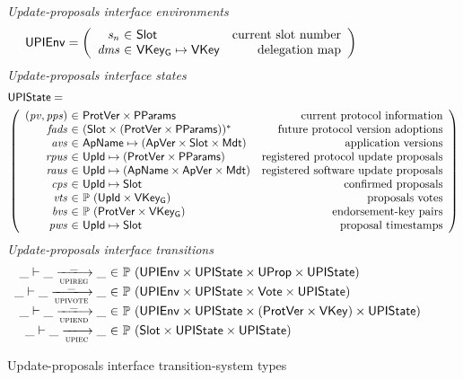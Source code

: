 \begin{figure}[htb]
  \emph{Update-proposals interface environments}
  \begin{align*}
    & \UPIEnv
      = \left(
      \begin{array}{r@{~\in~}lr}
        \var{s_n} & \Slot & \text{current slot number}\\
        \var{dms} & \VKeyGen \mapsto \VKey & \text{delegation map}
      \end{array}\right)
  \end{align*}
  \emph{Update-proposals interface states}
  \begin{align*}
    & \UPIState = \\
    & \left(
      \begin{array}{r@{~\in~}lr}
        (\var{pv}, \var{pps}) & \ProtVer \times \PPMMap
        & \text{current protocol information}\\
        \var{fads} & \seqof{(\Slot \times (\ProtVer \times \PPMMap))}
        & \text{future protocol version adoptions}\\
        \var{avs} & \ApName \mapsto (\ApVer \times \Slot \times \Metadata)
        & \text{application versions}\\
        \var{rpus} & \UPropId \mapsto (\ProtVer \times \PPMMap)
        & \text{registered protocol update proposals}\\
        \var{raus} & \UPropId \mapsto (\ApName \times \ApVer \times \Metadata)
        & \text{registered software update proposals}\\
        \var{cps} & \UPropId \mapsto \Slot & \text{confirmed proposals}\\
        \var{vts} & \powerset{(\UPropId \times \VKeyGen)} & \text{proposals votes}\\
        \var{bvs} & \powerset{(\ProtVer \times \VKeyGen)}
                           & \text{endorsement-key pairs}\\
        \var{pws} & \UPropId \mapsto \Slot & \text{proposal timestamps}
      \end{array}\right)\\
  \end{align*}
  \emph{Update-proposals interface transitions}
  \begin{equation*}
    \begin{array}{r@{~\in~}l}
      \_ \vdash \_ \trans{upireg}{\_} \_ &
      \powerset (\UPIEnv \times \UPIState \times \UProp \times \UPIState)\\
      \_ \vdash \_ \trans{upivote}{\_} \_ &
      \powerset (\UPIEnv \times \UPIState \times \Vote \times \UPIState)\\
      \_ \vdash \_ \trans{upiend}{\_} \_ &
      \powerset (\UPIEnv \times \UPIState
      \times (\ProtVer \times \VKey) \times \UPIState)\\
      \_ \vdash \_ \trans{upiec}{} \_ &
      \powerset (\Slot \times \UPIState \times \UPIState)
    \end{array}
  \end{equation*}
  \caption{Update-proposals interface transition-system types}
  \label{fig:ts-types:upi}
\end{figure}

